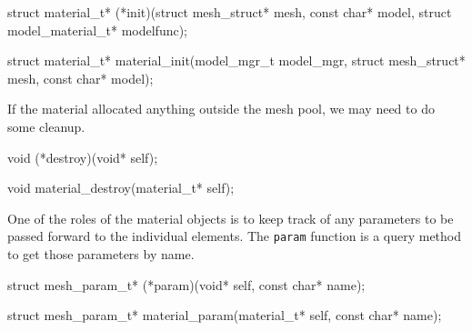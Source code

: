 \nwenddocs{}\endmoddef
struct material_t* (*init)(struct mesh_struct* mesh, const char* model,
                           struct model_material_t* modelfunc);
\nwendcode{}\nwdocspar

\nwenddocs{}\plusendmoddef
struct material_t* material_init(model_mgr_t model_mgr, 
                                 struct mesh_struct* mesh, const char* model);
\nwendcode{}\nwdocspar

If the material allocated anything outside the mesh pool,
we may need to do some cleanup.

\nwenddocs{}\plusendmoddef
void (*destroy)(void* self);
\nwendcode{}\nwdocspar

\nwenddocs{}\plusendmoddef
void material_destroy(material_t* self);
\nwendcode{}\nwdocspar


One of the roles of the material objects is to keep track of any
parameters to be passed forward to the individual elements.
The {\tt{}param} function is a query method to get those parameters
by name.

\nwenddocs{}\plusendmoddef
struct mesh_param_t* (*param)(void* self, const char* name);
\nwendcode{}\nwdocspar

\nwenddocs{}\plusendmoddef
struct mesh_param_t* material_param(material_t* self, const char* name);
\nwendcode{}\nwdocspar

